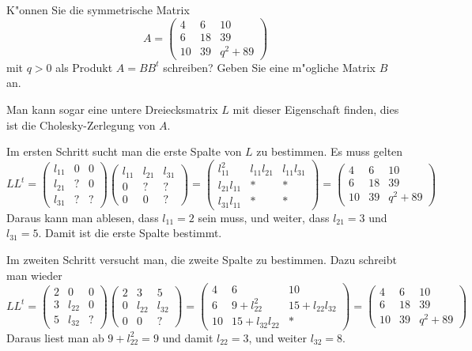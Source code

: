 K"onnen Sie die symmetrische Matrix
\[
A=\begin{pmatrix}
 4& 6&10\\
 6&18&39\\
10&39&q^2 + 89
\end{pmatrix}
\]
mit $q>0$ als Produkt $A=BB^t$ schreiben?
Geben Sie eine m"ogliche Matrix $B$ an.

\begin{loesung}
Man kann sogar eine untere Dreiecksmatrix $L$ mit dieser Eigenschaft finden,
dies ist die Cholesky-Zerlegung von $A$.

Im ersten Schritt sucht man die erste Spalte von $L$ zu bestimmen.
Es muss gelten
\[
LL^t=
\begin{pmatrix}
l_{11}&  0&  0\\
l_{21}&  ?&  0\\
l_{31}&  ?&  ?
\end{pmatrix}
\begin{pmatrix}
l_{11}&l_{21}&l_{31}\\
     0&     ?&     ?\\
     0&     0&     ?
\end{pmatrix}
=
\begin{pmatrix}
    l_{11}^2&l_{11}l_{21}&l_{11}l_{31}\\
l_{21}l_{11}&           *&           *\\
l_{31}l_{11}&           *&           *
\end{pmatrix}
=
\begin{pmatrix}
 4& 6&10\\
 6&18&39\\
10&39&q^2 + 89
\end{pmatrix}
\]
Daraus kann man ablesen, dass $l_{11}=2$ sein muss, und weiter,
dass
$l_{21}=3$ und $l_{31}=5$. Damit ist die erste Spalte bestimmt.

Im zweiten Schritt versucht man, die zweite Spalte zu bestimmen.
Dazu schreibt man wieder
\[
LL^t
=
\begin{pmatrix}
2&     0&0\\
3&l_{22}&0\\
5&l_{32}&?
\end{pmatrix}
\begin{pmatrix}
2&     3&     5\\
0&l_{22}&l_{32}\\
0&     0&?
\end{pmatrix}
=
\begin{pmatrix}
 4&              6&            10\\
 6& 9+l_{22}^2    &15+l_{22}l_{32}\\
10&15+l_{32}l_{22}&             *
\end{pmatrix}
=
\begin{pmatrix}
 4& 6&10\\
 6&18&39\\
10&39& q^2 + 89
\end{pmatrix}
\]
Daraus liest man ab $9+l_{22}^2=9$ und damit $l_{22}=3$, und weiter
$l_{32}=8$.


\end{loesung}
